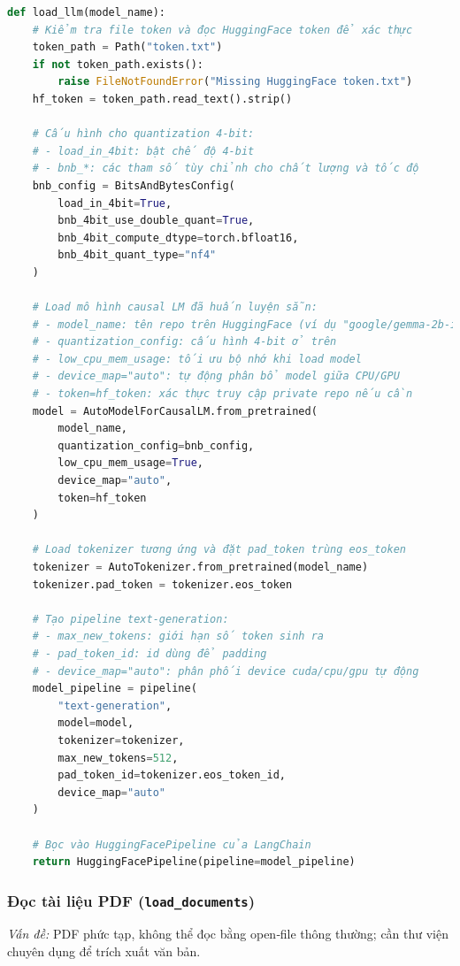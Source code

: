 \documentclass[11pt]{article}
\begin{document}
\begin{lstlisting}[language=Python, caption=Tải và cấu hình LLM với comment giải thích]
def load_llm(model_name):
    # Kiểm tra file token và đọc HuggingFace token để xác thực
    token_path = Path("token.txt")
    if not token_path.exists():
        raise FileNotFoundError("Missing HuggingFace token.txt")
    hf_token = token_path.read_text().strip()

    # Cấu hình cho quantization 4-bit:
    # - load_in_4bit: bật chế độ 4-bit
    # - bnb_*: các tham số tùy chỉnh cho chất lượng và tốc độ
    bnb_config = BitsAndBytesConfig(
        load_in_4bit=True,
        bnb_4bit_use_double_quant=True,
        bnb_4bit_compute_dtype=torch.bfloat16,
        bnb_4bit_quant_type="nf4"
    )

    # Load mô hình causal LM đã huấn luyện sẵn:
    # - model_name: tên repo trên HuggingFace (ví dụ "google/gemma-2b-it")
    # - quantization_config: cấu hình 4-bit ở trên
    # - low_cpu_mem_usage: tối ưu bộ nhớ khi load model
    # - device_map="auto": tự động phân bổ model giữa CPU/GPU
    # - token=hf_token: xác thực truy cập private repo nếu cần
    model = AutoModelForCausalLM.from_pretrained(
        model_name,
        quantization_config=bnb_config,
        low_cpu_mem_usage=True,
        device_map="auto",
        token=hf_token
    )

    # Load tokenizer tương ứng và đặt pad_token trùng eos_token
    tokenizer = AutoTokenizer.from_pretrained(model_name)
    tokenizer.pad_token = tokenizer.eos_token

    # Tạo pipeline text-generation:
    # - max_new_tokens: giới hạn số token sinh ra
    # - pad_token_id: id dùng để padding
    # - device_map="auto": phân phối device cuda/cpu/gpu tự động
    model_pipeline = pipeline(
        "text-generation",
        model=model,
        tokenizer=tokenizer,
        max_new_tokens=512,
        pad_token_id=tokenizer.eos_token_id,
        device_map="auto"
    )

    # Bọc vào HuggingFacePipeline của LangChain
    return HuggingFacePipeline(pipeline=model_pipeline)
\end{lstlisting}



\subsubsection*{Đọc tài liệu PDF (\texttt{load\_documents})}

\textit{Vấn đề:} PDF phức tạp, không thể đọc bằng open‑file thông thường; cần thư viện chuyên dụng để trích xuất văn bản.\\
\end{document}

